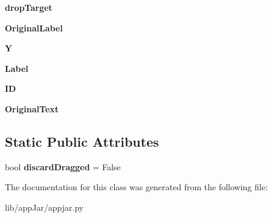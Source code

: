 \begin{DoxyCompactItemize}
\mbox{\label{classappjar_1_1_draggable_widget_a438ba94f4378a6fe05225ac4efee7809}} 
{\bfseries drop\+Target}
\item 
\mbox{\label{classappjar_1_1_draggable_widget_abccd2fba7d53420354e3a4d9f9dcd8eb}} 
{\bfseries Original\+Label}
\item 
\mbox{\label{classappjar_1_1_draggable_widget_a9563641e352e55cca5f6b00cc85482e8}} 
{\bfseries Y}
\item 
\mbox{\label{classappjar_1_1_draggable_widget_a4cbdb64ba7549a13296d02ddff531ac5}} 
{\bfseries Label}
\item 
\mbox{\label{classappjar_1_1_draggable_widget_ac04d15e147ab7737286abbc5c0d00765}} 
{\bfseries ID}
\item 
\mbox{\label{classappjar_1_1_draggable_widget_a51cdb225f0f47df78d829a0e376ec1f6}} 
{\bfseries Original\+Text}
\end{DoxyCompactItemize}
\subsection*{Static Public Attributes}
\begin{DoxyCompactItemize}
\item 
\mbox{\label{classappjar_1_1_draggable_widget_ad8081ee76633b6953b2ba7e4bf1ea59b}} 
bool {\bfseries discard\+Dragged} = False
\end{DoxyCompactItemize}


The documentation for this class was generated from the following file\+:\begin{DoxyCompactItemize}
\item 
lib/app\+Jar/appjar.\+py\end{DoxyCompactItemize}

